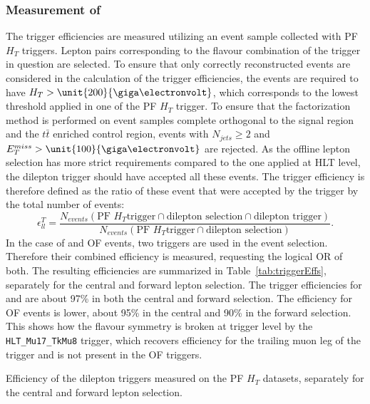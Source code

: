 \subsubsection{Measurement of \RT}
\label{sec:triggerEffs}
The trigger efficiencies are measured utilizing an event sample collected with PF $H_T$ triggers. Lepton pairs corresponding to the flavour combination of the trigger in question are selected. To ensure that only correctly reconstructed events are considered in the calculation of the trigger efficiencies, the events are required to have $H_T > \unit{200}{\giga\electronvolt}$, which corresponds to the lowest threshold applied in one of the PF $H_T$ trigger. To ensure that the factorization method is performed on event samples complete orthogonal to the signal region and the $t\bar{t}$ enriched control region, events with $N_{jets} \geq 2$ and $\MET > \unit{100}{\giga\electronvolt}$ are rejected. As the offline lepton selection has more strict requirements compared to the one applied at HLT level, the dilepton trigger should have accepted all these events. The trigger efficiency is therefore defined as the ratio of these event that were accepted by the trigger by the total number of events:
\begin{equation}
\epsilon_{ll}^T = \frac{N_{events}(\text{PF }H_T\text{trigger} \cap \text{dilepton selection} \cap \text{dilepton trigger})}{N_{events}(\text{PF }H_T\text{trigger} \cap \text{dilepton selection})}.
\end{equation}
In the case of \MM and OF events, two triggers are used in the event selection. Therefore their combined efficiency is measured, requesting the logical OR of both. The resulting efficiencies are summarized in Table~\ref{tab:triggerEffs}, separately for the central and forward lepton selection. The trigger efficiencies for \EE and \MM are about 97\% in both the central and forward selection. The efficiency for OF events is lower, about 95\% in the central and 90\% in the forward selection. This shows how the flavour symmetry is broken at trigger level by the \verb+HLT_Mu17_TkMu8+ trigger, which recovers efficiency for the trailing muon leg of the trigger and is not present in the OF triggers.   
\begin{table}
\begin{center}

\caption{Efficiency of the dilepton triggers measured on the PF $H_T$ datasets, separately for the central and forward lepton selection.}
\label{tab:triggerEffs}
\end{center}
\end{table}
